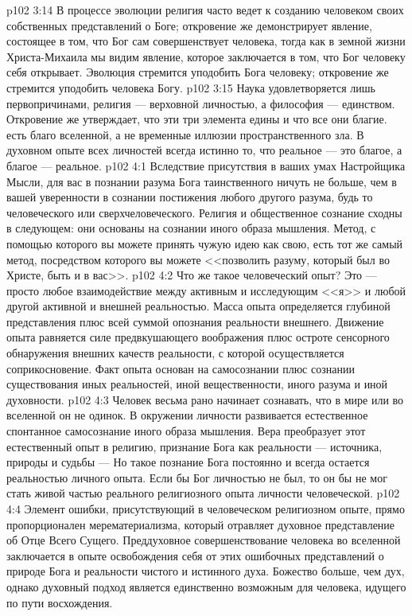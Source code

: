 \vs p102 3:14 В процессе эволюции религия часто ведет к созданию человеком своих собственных представлений о Боге; откровение же демонстрирует явление, состоящее в том, что Бог сам совершенствует человека, тогда как в земной жизни Христа\hyp{}Михаила мы видим явление, которое заключается в том, что Бог человеку себя открывает. Эволюция стремится уподобить Бога человеку; откровение же стремится уподобить человека Богу.
\vs p102 3:15 Наука удовлетворяется лишь первопричинами, религия --- верховной личностью, а философия --- единством. Откровение же утверждает, что эти три элемента едины и что все они благие.  есть благо вселенной, а не временные иллюзии пространственного зла. В духовном опыте всех личностей всегда истинно то, что реальное --- это благое, а благое --- реальное.
\vs p102 4:1 Вследствие присутствия в ваших умах Настройщика Мысли, для вас в познании разума Бога таинственного ничуть не больше, чем в вашей уверенности в сознании постижения любого другого разума, будь то человеческого или сверхчеловеческого. Религия и общественное сознание сходны в следующем: они основаны на сознании иного образа мышления. Метод, с помощью которого вы можете принять чужую идею как свою, есть тот же самый метод, посредством которого вы можете <<позволить разуму, который был во Христе, быть и в вас>>.
\vs p102 4:2 Что же такое человеческий опыт? Это --- просто любое взаимодействие между активным и исследующим <<я>> и любой другой активной и внешней реальностью. Масса опыта определяется глубиной представления плюс всей суммой опознания реальности внешнего. Движение опыта равняется силе предвкушающего воображения плюс остроте сенсорного обнаружения внешних качеств реальности, с которой осуществляется соприкосновение. Факт опыта основан на самосознании плюс сознании существования иных реальностей, иной вещественности, иного разума и иной духовности.
\vs p102 4:3 Человек весьма рано начинает сознавать, что в мире или во вселенной он не одинок. В окружении личности развивается естественное спонтанное самосознание иного образа мышления. Вера преобразует этот естественный опыт в религию, признание Бога как реальности --- источника, природы и судьбы ---  Но такое познание Бога постоянно и всегда остается реальностью личного опыта. Если бы Бог личностью не был, то он бы не мог стать живой частью реального религиозного опыта личности человеческой.
\vs p102 4:4 Элемент ошибки, присутствующий в человеческом религиозном опыте, прямо пропорционален мерематериализма, который отравляет духовное представление об Отце Всего Сущего. Преддуховное совершенствование человека во вселенной заключается в опыте освобождения себя от этих ошибочных представлений о природе Бога и реальности чистого и истинного духа. Божество больше, чем дух, однако духовный подход является единственно возможным для человека, идущего по пути восхождения.
